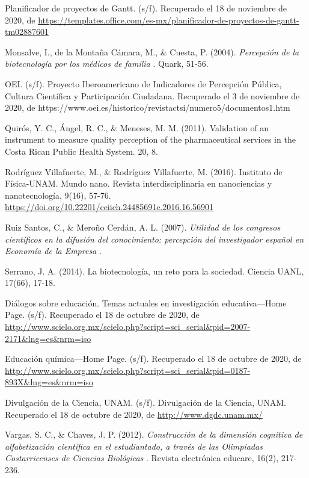 \documentclass[12pt]{article}
\begin{document}
\begin{thebibliography}{X}
	 Planificador de proyectos de Gantt. (s/f). Recuperado el 18 de noviembre de 2020, de \url{https://templates.office.com/es-mx/planificador-de-proyectos-de-gantt-tm02887601}

	
	 Monsalve, I., de la Montaña Cámara, M., \& Cuesta, P. (2004). \textit{ Percepción de la biotecnología por los médicos de familia }. Quark, 51-56.

	 OEI. (s/f). Proyecto Iberoamericano de Indicadores de Percepción Pública, Cultura Científica y Participación Ciudadana. Recuperado el 3 de noviembre de 2020, de https://www.oei.es/historico/revistactsi/numero5/documentos1.htm
	
	 Quirós, Y. C., Ángel, R. C., \& Meneses, M. M. (2011). Validation of an instrument to measure quality perception of the pharmaceutical services in the Costa Rican Public Health System. 20, 8.
	
	\bibitem[Rodriguez, 2016]{}  Rodríguez Villafuerte, M., \& Rodríguez Villafuerte, M. (2016). Instituto de Física-UNAM. Mundo nano. Revista interdisciplinaria en nanociencias y nanotecnología, 9(16), 57-76. \url{https://doi.org/10.22201/ceiich.24485691e.2016.16.56901}
	
	 Ruiz Santos, C., \& Meroño Cerdán, A. L. (2007). \textit{ Utilidad de los congresos científicos en la difusión del conocimiento: percepción del investigador español en Economía de la Empresa }.
	
	 Serrano, J. A. (2014). La biotecnología, un reto para la sociedad. Ciencia UANL, 17(66), 17-18.
	
	 Diálogos sobre educación. Temas actuales en investigación educativa—Home Page. (s/f). Recuperado el 18 de octubre de 2020, de \url{http://www.scielo.org.mx/scielo.php?script=sci_serial&pid=2007-2171&lng=es&nrm=iso}
	
	 Educación química—Home Page. (s/f). Recuperado el 18 de octubre de 2020, de \url{http://www.scielo.org.mx/scielo.php?script=sci_serial&pid=0187-893X&lng=es&nrm=iso}
	
	 Divulgación de la Ciencia, UNAM. (s/f). Divulgación de la Ciencia, UNAM. Recuperado el 18 de octubre de 2020, de \url{http://www.dgdc.unam.mx/}
	
	Vargas, S. C., \& Chaves, J. P. (2012). \textit{ Construcción de la dimensión cognitiva de alfabetización científica en el estudiantado, a través de las Olimpiadas Costarricenses de Ciencias Biológicas }. Revista electrónica educare, 16(2), 217-236.
	

\end{thebibliography}
\end{document}
